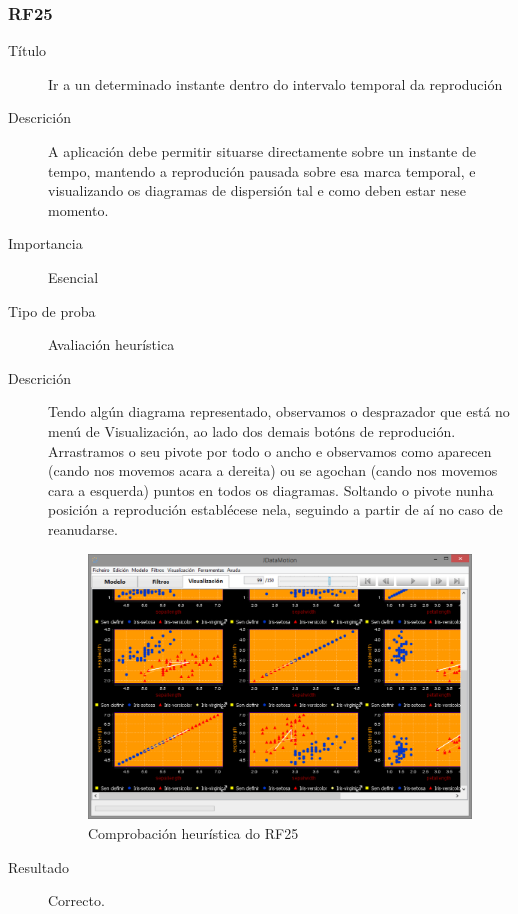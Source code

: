 \subsubsection*{RF25}
\begin{description}
\item[Título] \hfill
Ir a un determinado instante dentro do intervalo temporal da reprodución
\item[Descrición] \hfill
A aplicación debe permitir situarse directamente sobre un instante de tempo, mantendo a reprodución pausada sobre esa marca temporal, e visualizando os diagramas de dispersión tal e como deben estar nese momento.
\item[Importancia] \hfill
Esencial
\item[Tipo de proba] \hfill
Avaliación heurística
\item[Descrición]
Tendo algún diagrama representado, observamos o desprazador que está no menú de Visualización, ao lado dos demais botóns de reprodución. Arrastramos o seu pivote por todo o ancho e observamos como aparecen (cando nos movemos acara a dereita) ou se agochan (cando nos movemos cara a esquerda) puntos en todos os diagramas. Soltando o pivote nunha posición a reprodución establécese nela, seguindo a partir de aí no caso de reanudarse.
\begin{figure}
\centering
\includegraphics[width=\textwidth,height=\textheight,keepaspectratio]{figuras/RF25}
\caption{Comprobación heurística do RF25}
\label{RF25}
\end{figure}
\item[Resultado]
Correcto.
\end{description}

